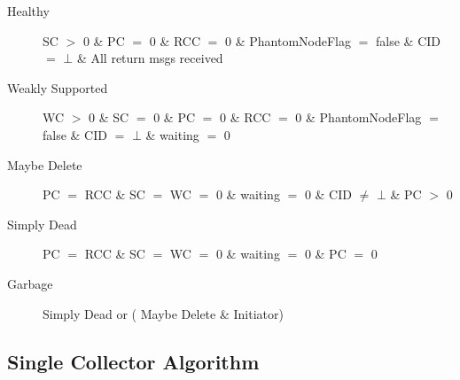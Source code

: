 \begin{description}
\item[Healthy] SC $>$ 0 \& PC $=$ 0 \& RCC $=$ 0 \& PhantomNodeFlag $=$ false 
\& CID $=$ $\bot$ \& All return msgs received
\item[Weakly Supported] WC $>$ 0 \& SC $=$ 0 \& PC $=$ 0 \& RCC
$=$ 0 \& PhantomNodeFlag $=$ false \& CID $=$ $\bot$ \& waiting $=$ 0 
\item[Maybe Delete] PC $=$ RCC \& SC $=$ WC $=$ 0 \& waiting $=$ 0 \& CID $\neq$ $\bot$ \& PC $>$ 0
\item [Simply Dead] PC $=$ RCC \& SC $=$ WC $=$ 0 \& waiting $=$ 0 \& PC $=$ 0
  	\item [Garbage] Simply Dead or  ( Maybe Delete \& Initiator)
\end{description}

\subsection{Single Collector Algorithm}
\label{singlealgo}
